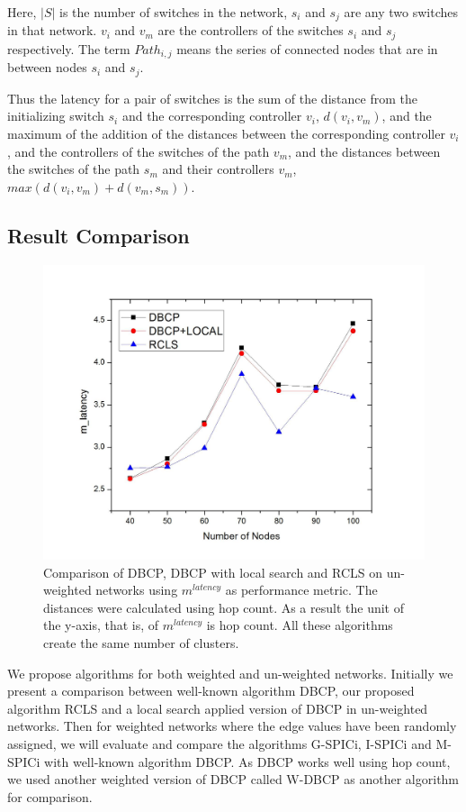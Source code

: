 \documentclass[a4paper,twocolumn,preprint]{elsarticle}
\begin{document}
Here, $|S|$ is the number of switches in the network, $s_i$ and $s_j$ are any two switches in that network. $v_i$ and $v_m$ are the controllers of the switches $s_i$ and $s_j$ respectively. The term $Path_{i,j}$ means the series of connected nodes that are in between nodes $s_i$ and $s_j$.

Thus the latency for a pair of switches is the sum of the distance from the initializing switch $s_i$ and the corresponding controller $v_i$, $d(v_i,v_m)$, and the maximum of the addition of the distances between the corresponding controller $v_i$, and the controllers of the switches of the path $v_m$, and the distances between the switches of the path $s_m$ and their controllers $v_m$, $max(d(v_i,v_m)+d(v_m,s_m))$.
\subsection{Result Comparison}


\begin{figure}
	\includegraphics[width=\linewidth]{ugraph.jpg}
	\caption{Comparison of DBCP, DBCP with local search and RCLS on un-weighted networks using $m^{latency}$ as performance metric. The distances were calculated using hop count. As a result the unit of the y-axis, that is, of $m^{latency}$ is hop count. All these algorithms create the same number of clusters.}
	\label{fig:ugraph}
\end{figure}


We propose algorithms for both weighted and un-weighted networks. Initially we present a comparison between well-known algorithm DBCP, our proposed algorithm RCLS and a local search applied version of DBCP in un-weighted networks. Then for weighted networks where the edge values have been randomly assigned, we will evaluate and compare the algorithms G-SPICi, I-SPICi and M-SPICi with well-known algorithm DBCP. As DBCP works well using hop count, we used another weighted version of DBCP called W-DBCP as another algorithm for comparison.
\end{document}
